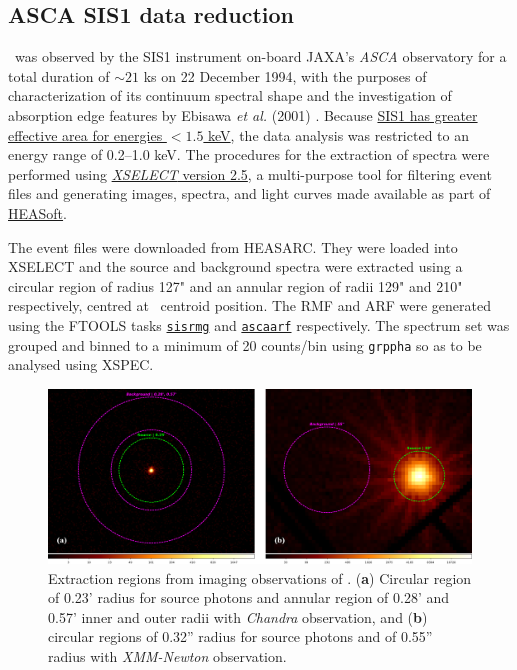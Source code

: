     \subsection{ASCA SIS1 data reduction}
    	\source\ was observed by the SIS1 instrument on-board JAXA's \textit{ASCA} observatory for a total duration of $\sim 21$ ks on 22 December 1994, with the purposes of characterization of its continuum spectral shape and the investigation of absorption edge features by Ebisawa \textit{et al.} (2001) \cite{ebisawaAsca2001ApJ}.
    	Because %
    	\href{https://heasarc.gsfc.nasa.gov/docs/asca/newsletters/sis_overview.html}{SIS1 has greater effective area for energies $<1.5$ keV}, the data analysis was restricted to an energy range of 0.2--1.0 keV. The procedures for the extraction of spectra were performed using %
    	\href{https://heasarc.gsfc.nasa.gov/ftools/xselect/}{\textit{XSELECT} version 2.5}, a multi-purpose tool for filtering event files and generating images, spectra, and light curves made available as part of \href{https://heasarc.gsfc.nasa.gov/docs/software/heasoft/}{HEASoft}.
    	
    	The event files were downloaded from HEASARC. They were loaded into XSELECT and the source and background spectra were extracted using a circular region of radius 127" and an annular region of radii 129" and 210" respectively, centred at \source\ centroid position. The RMF and ARF were generated using the FTOOLS tasks %
    	\href{https://heasarc.gsfc.nasa.gov/lheasoft/ftools/fhelp/sisrmg.html}{\texttt{sisrmg}} and %
    	\href{https://heasarc.gsfc.nasa.gov/lheasoft/ftools/fhelp/ascaarf.html}{\texttt{ascaarf}} respectively. The spectrum set was grouped and binned to a minimum of 20 counts/bin using \texttt{grppha} so as to be analysed using XSPEC.
    	
    	\begin{figure}[!htb]
	        \centering
	        \includegraphics[width=\textwidth]{figures/rx-j0925-7-4758_src-bkg}
	        \caption{Extraction regions from imaging observations of \source. (\textbf{a}) Circular region of 0.23' radius for source photons and annular region of 0.28' and 0.57' inner and outer radii with \textit{Chandra} observation, and (\textbf{b}) circular regions of 0.32'' radius for source photons and of 0.55'' radius with \textit{XMM-Newton} observation.}
	        \label{fig:src-bkg}
	    \end{figure}
	    
